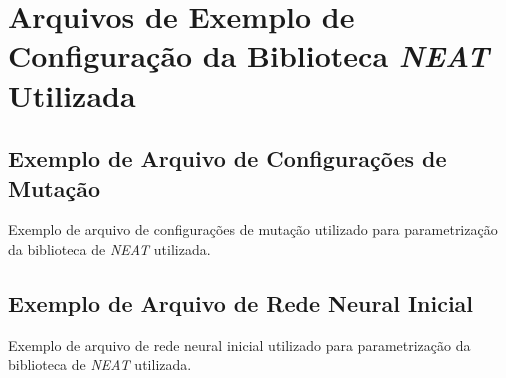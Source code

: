 \chapter{\label{appendix:neat-configs}Arquivos de Exemplo de Configuração da
Biblioteca \textit{NEAT} Utilizada}

\section{Exemplo de Arquivo de Configurações de Mutação}
\begin{algorithm}[H]

\caption[Exemplo de arquivo de configurações de mutação utilizado para
	parametrização da biblioteca de \textit{NEAT} utilizada.]
{\label{alg:neat-parameters-example}Exemplo de arquivo de configurações de
	mutação utilizado para parametrização da biblioteca de \textit{NEAT}
	utilizada.}
\end{algorithm}



\section{Exemplo de Arquivo de Rede Neural Inicial}
\begin{algorithm}[H]

\caption[Exemplo de arquivo de rede neural inicial utilizado para parametrização
	da biblioteca de \textit{NEAT} utilizada.]
{\label{alg:neat-network-example}Exemplo de arquivo de rede neural inicial
	utilizado para parametrização da biblioteca de \textit{NEAT} utilizada.}
\end{algorithm}


